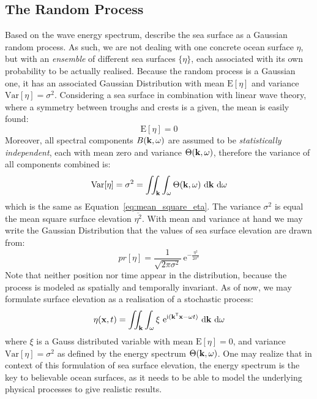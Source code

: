 \subsection{The Random Process}
\label{sec:random_process}
Based on the wave energy spectrum, \citet{Neumann:1966} describe the sea surface
as a Gaussian random process.
As such, we are not dealing with one concrete ocean surface $\eta$, but with an
\emph{ensemble} of different sea surfaces $\{\eta\}$, each associated with its
own probability to be actually realised. Because the random process is a
Gaussian one, it has an associated Gaussian Distribution with mean
$\mathrm{E}[\eta]$ and variance $\mathrm{Var}[\eta] = \sigma^2$. Considering a
sea surface in combination with linear wave theory, where a symmetry between
troughs and crests is a given, the mean is easily found:
\begin{equation*}
 \mathrm{E}[\eta] = 0
\end{equation*}
%
Moreover, all spectral components $B(\mathbf{k},\omega)$ are assumed to be
\emph{statistically independent}, each with mean zero and variance $\Theta(\mathbf{k},\omega)$,
therefore the variance of all components combined is:
\begin{equation*}
\label{eq:random_process_variance}
\mathrm{Var}[\eta] = \sigma^2 = \iint_{\mathbf{k}}
\int_{\omega}\Theta(\mathbf{k},\omega)~\mathrm{d}\mathbf{k}~\mathrm{ d}\omega
\end{equation*}
which is the same as Equation~\ref{eq:mean_square_eta}. The variance
$\sigma^2$ is equal the mean square surface elevation $\overline{\eta^2}$. With
mean and variance at hand we may write the Gaussian Distribution that the
values of sea surface elevation are drawn from:
\begin{equation}
\label{eq:gaussian_dist}
 pr[\eta] = \frac{1}{\sqrt{2\pi\sigma^2}}~\mathrm{e}^{-\frac{\eta^2}{2\sigma^2}}
\end{equation}
Note that neither position nor time appear in the distribution, because the
process is modeled as spatially and temporally invariant.
As of now, we may formulate surface elevation as a realisation of a stochastic process:
\begin{equation}
\label{eq:surface_elevation_gauss}
 \eta(\mathbf{x}, t) = \iint_{\mathbf{k}}\int_{\omega} \xi
~\mathrm{e}^{\mathrm{i}(\mathbf{k}^{\mathsf{T}}\mathbf{x}-
\omega t)}~
\mathrm{d}\mathbf{k}~\mathrm{d}\omega
\end{equation}
where $\xi$ is a Gauss distributed variable with mean $\mathrm{E}[\eta] = 0$,
and variance $\mathrm{Var}[\eta] = \sigma^2$ as defined by the energy spectrum
$\Theta(\mathbf{k}, \omega)$. One may realize that in context of this formulation
of sea surface elevation, the energy spectrum is the key to believable
ocean surfaces, as it needs to be able to model the underlying physical
processes to give realistic results.\\

